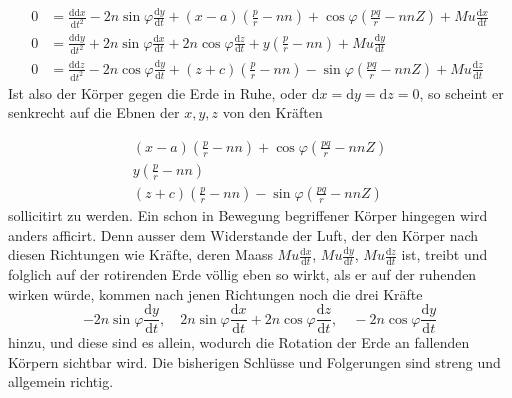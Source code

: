 \[
\begin{aligned}
0&=\tfrac{\mathrm{dd}x}{\mathrm{d}t^2}-2n\sin\varphi\tfrac{\mathrm{d}y}{\mathrm{d}t}+(x-a)(\tfrac pr-nn)+\cos\varphi(\tfrac{pq}{r}-nnZ)+Mu\tfrac{\mathrm{d}x}{\mathrm{d}t}\\
0&=\tfrac{\mathrm{dd}y}{\mathrm{d}t^2}+2n\sin\varphi\tfrac{\mathrm{d}x}{\mathrm{d}t}+2n\cos\varphi\tfrac{\mathrm{d}z}{\mathrm{d}t}+y(\tfrac pr-nn)+Mu\tfrac{\mathrm{d}y}{\mathrm{d}t}\\
0&=\tfrac{\mathrm{dd}z}{\mathrm{d}t^2}-2n\cos\varphi\tfrac{\mathrm{d}y}{\mathrm{d}t}+(z+c)(\tfrac pr-nn)-\sin\varphi(\tfrac{pq}{r}-nnZ)+Mu\tfrac{\mathrm{d}z}{\mathrm{d}t}
\end{aligned}
\]
Ist also der Körper gegen die Erde in Ruhe, oder $\mathrm{d}x=\mathrm{d}y=\mathrm{d}z=0$, so scheint er senkrecht auf die Ebnen der $x,y,z$ von den Kräften
\par\clearpage
{}
\[
\begin{gathered}
(x-a)(\tfrac pr-nn)+\cos\varphi(\tfrac{pq}{r}-nnZ)\\
y(\tfrac pr-nn)\\
(z+c)(\tfrac pr-nn)-\sin\varphi(\tfrac{pq}{r}-nnZ)
\end{gathered}
\]
sollicitirt zu werden. Ein schon in Bewegung begriffener Körper hingegen wird anders afficirt. Denn ausser dem Widerstande der Luft, der den Körper nach diesen Richtungen wie Kräfte, deren Maass $Mu\tfrac{\mathrm{d}x}{\mathrm{d}t}$, $Mu\tfrac{\mathrm{d}y}{\mathrm{d}t}$, $Mu\tfrac{\mathrm{d}z}{\mathrm{d}t}$ ist, treibt und folglich auf der rotirenden Erde völlig eben so wirkt, als er auf der ruhenden wirken würde, kommen nach jenen Richtungen noch die drei Kräfte
\[
-2n\sin\varphi\frac{\mathrm{d}y}{\mathrm{d}t},\quad 2n\sin\varphi\frac{\mathrm{d}x}{\mathrm{d}t}+2n\cos\varphi\frac{\mathrm{d}z}{\mathrm{d}t},\quad -2n\cos\varphi\frac{\mathrm{d}y}{\mathrm{d}t}
\]
hinzu, und diese sind es allein, wodurch die Rotation der Erde an fallenden Körpern sichtbar wird. Die bisherigen Schlüsse und Folgerungen sind streng und allgemein richtig.

